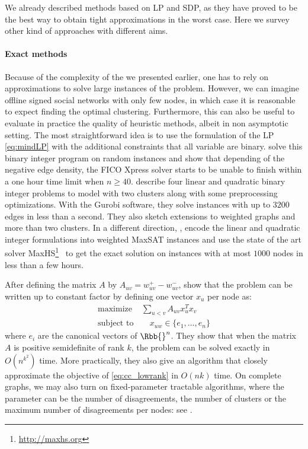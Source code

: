 We already described methods based on LP and SDP, as they have proved to be the best way to obtain
tight approximations in the worst case. Here we survey other kind of approaches with different aims.

\paragraph{Exact methods} Because of the complexity of the \pcc{} we presented earlier, one has to
rely on approximations to solve large instances of the problem. However, we can imagine offline
signed social networks with only few nodes, in which case it is reasonable to expect finding the
optimal clustering. Furthermore, this can also be useful to evaluate in practice the quality of
heuristic methods, albeit in non asymptotic setting. The most straightforward idea is to use the
formulation of the LP \eqref{eq:mindLP} with the additional constraints that all variable are
binary. \Textcite{ExactMIP13} solve this binary integer program on random instances and show that
depending of the negative edge density, the FICO Xpress solver starts to be unable to finish within
a one hour time limit when $n \geq 40$.
\Textcite{Aref2016} describe four linear and quadratic  binary integer problems
to model \pcc{} with two clusters along with some preprocessing optimizations. With the Gurobi
software, they solve instances with up to $3200$ edges in less than a second. They also sketch
extensions to weighted graphs and more than two clusters.
In a different direction, \textcite{Berg2015}, encode the linear and quadratic integer formulations
into weighted MaxSAT instances and use the state of the art solver
MaxHS\footnote{\href{http://www.maxhs.org/}{http://maxhs.org}}~\autocite{SATSolver13} to get the
exact solution on instances with at most $1000$ nodes in less than a few hours.

After defining the matrix $A$ by $A_{uv} = w_{uv}^+ - w_{uv}^-$, \textcite{LowRank16} show that the
\maxa{} problem can be written up to constant factor by defining one vector $x_u$ per node as:
\begin{align}
   \label{eq:cc_lowrank}
   \text{maximize } & \sum_{u<v} A_{uv}x_u^Tx_v \\
   \text{subject to}& \quad x_{uw} \in \{e_1,\ldots, e_n\} \nonumber
\end{align}
where $e_i$ are the canonical vectors of $\Rbb{}^n$. They show that when the matrix $A$ is positive
semidefinite of rank $k$, the \pcc{} problem can be solved exactly in $O(n^{k^2})$ time. More
practically, they also give an algorithm that closely approximate the objective of
\eqref{eq:cc_lowrank} in $O(nk)$ time.
On complete graphs, we may also turn on fixed-parameter tractable algorithms, where the parameter
can be the number of disagreements, the number of clusters or the maximum number of disagreements
per nodes: see .

